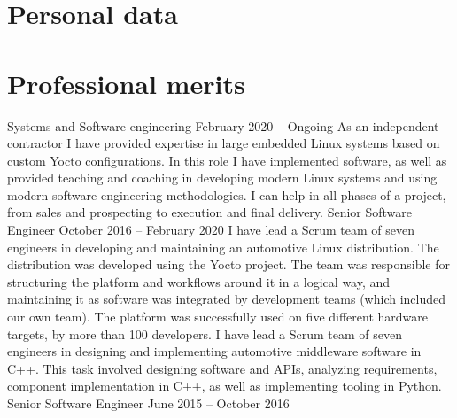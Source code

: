 \documentclass{twocolcv}
\begin{document}
\section*{Personal data}
\section*{Professional merits}
           {Systems and Software engineering}
           {February 2020 -- Ongoing}
           {
        {As an independent contractor I have provided expertise in large embedded Linux systems based on custom Yocto configurations. In this role I have implemented software, as well as provided teaching and coaching in developing modern Linux systems and using modern software engineering methodologies. I can help in all phases of a project, from sales and prospecting to execution and final delivery.}
}
           {Senior Software Engineer}
           {October 2016 -- February 2020}
           {
        {I have lead a Scrum team of seven engineers in developing and maintaining an automotive Linux distribution. The distribution was developed using the Yocto project. The team was responsible for structuring the platform and workflows around it in a logical way, and maintaining it as software was integrated by development teams (which included our own team). The platform was successfully used on five different hardware targets, by more than 100 developers.}
\newline\newline
{}
        {I have lead a Scrum team of seven engineers in designing and implementing automotive middleware software in C++. This task involved designing software and APIs, analyzing requirements, component implementation in C++, as well as implementing tooling in Python.
}
}
           {Senior Software Engineer}
           {June 2015 -- October 2016}
\end{document}
